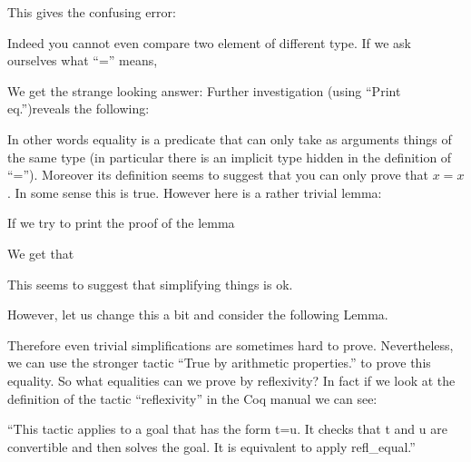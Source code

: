  This gives the confusing error:
 
 
 Indeed you cannot even compare two element of different type. If we ask ourselves what ``='' means,
 
 We get the strange looking answer:
Further investigation (using ``Print eq.'')reveals the following:
 
 In other words equality is a predicate that can only take as arguments things of the same type (in particular there is an implicit type hidden in the definition of ``=''). Moreover its definition seems to suggest that you can only prove that $x=x$. In some sense this is true. However here is a  rather trivial lemma:
 
 
If we try to print the proof of the lemma 


We get that 
 
This seems  to suggest that simplifying things is ok. 




However, let us change this a bit and consider the following Lemma.


Therefore even trivial simplifications are sometimes hard to prove. Nevertheless, we can use  the stronger tactic ``True by arithmetic properties.'' to prove this equality. 
So what  equalities can we prove by reflexivity?  In fact if we look at the definition of the tactic ``reflexivity'' in the Coq manual we can see:

``This tactic applies to a goal that has the form t=u. It checks that t and u are convertible and then solves the goal. It is equivalent to apply refl\_equal.''

